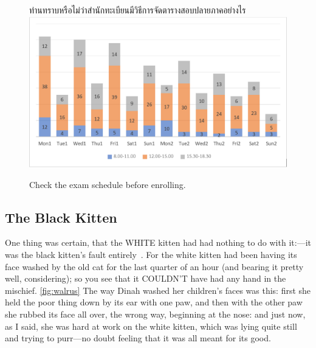 \begin{figure}
\begin{center}
ท่านทราบหรือไม่ว่าสำนักทะเบียนมีวิธีการจัดตารางสอบปลายภาคอย่างไร
\includegraphics[width=\linewidth]{images/bar_chart.png}
\end{center}
\caption[Poem]{Check the exam schedule before enrolling.}
\label{fig:enroll}     
\end{figure}

\subsection{The Black Kitten}
  One thing was certain, that the WHITE kitten had had nothing to
do with it:---it was the black kitten's fault entirely~\cite{aiw}.  For the
white kitten had been having its face washed by the old cat for
the last quarter of an hour (and bearing it pretty well,
considering); so you see that it COULDN'T have had any hand in
the mischief.
\ref{fig:walrus}
  The way Dinah washed her children's faces was this:  first she
held the poor thing down by its ear with one paw, and then with
the other paw she rubbed its face all over, the wrong way,
beginning at the nose:  and just now, as I said, she was hard at
work on the white kitten, which was lying quite still and trying
to purr---no doubt feeling that it was all meant for its good.

  